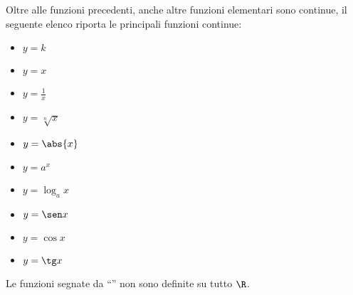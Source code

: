 \begin{comment}

\begin{teorema}[Continuità della funzione esponenziale]
La funzione esponenziale (\(y=a^x\)) è continua.
\end{teorema}

\noindent Ipotesi: \(f(x)=a^x\).\tab Tesi: \(f(x)\) è continua.

\affiancati{.49}{.49}{
\emph{Dimostrazione}
Usando la prima proprietà delle potenze:

\begin{align*}
f(x+\epsilon) &= 
a^{x+\epsilon} = a^{x} \cdot a^{\epsilon} = 
a^{x} \cdot \tonda{1 + \delta} = \\
&=a^{x} \cdot \tonda{1 + \delta} + a^x \cdot \delta \approx 
a^{x} = f(x) \qed
\end{align*}
}{
\begin{center} \continuitafesp \end{center}
}

\end{comment}




\noindent\begin{minipage}{\textwidth}
Oltre alle funzioni precedenti, anche altre funzioni elementari sono 
continue, il seguente elenco riporta le principali funzioni continue:

\noindent\begin{minipage}{1.05\textwidth}
\begin{multicols}{5}
\begin{itemize} [noitemsep]
 \item \(y=k\)
 \item \(y=x\)
 \item \(y=\frac{1}{x}\)  \textasteriskcentered
 \item \(y=\sqrt[n]{x}\)  \textasteriskcentered
 \item \(y=\abs{x}\)
 \item \(y=a^x\)
 \item \(y=\log_a x\)  \textasteriskcentered
 \item \(y=\sen x\)
 \item \(y=\cos x\)
 \item \(y=\tg x\)  \textasteriskcentered
\end{itemize}
\end{multicols}
\end{minipage}

\begin{osservazione}
Le funzioni segnate da ``\textasteriskcentered'' non sono definite su 
tutto \(\R\).
\end{osservazione}
\end{minipage}

